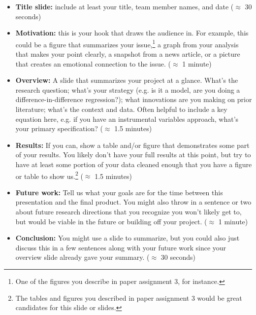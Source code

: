 \begin{itemize}
    \item[1)] \textbf{Title slide:} include at least your title, team member names, and date ($\approx$ 30 seconds)
    \item[2)] \textbf{Motivation:} this is your hook that draws the audience in. For example, this could be a figure that summarizes your issue,\footnote{One of the figures you describe in paper assignment 3, for instance.} a graph from your analysis that makes your point clearly, a snapshot from a news article, or a picture that creates an emotional connection to the issue. ($\approx$ 1 minute)
    \item[3)] \textbf{Overview:} A slide that summarizes your project at a glance. What's the research question; what's your strategy (e.g. is it a model, are you doing a difference-in-difference regression?); what innovations are you making on prior literature; what's the context and data. Often helpful to include a key equation here, e.g. if you have an instrumental variables approach, what's your primary specification? ($\approx$ 1.5 minutes)
    \item[4)] \textbf{Results:} If you can, show a table and/or figure that demonstrates some part of your results. You likely don't have your full results at this point, but try to have at least some portion of your data cleaned enough that you have a figure or table to show us.\footnote{The tables and figures you described in paper assignment 3 would be great candidates for this slide or slides.} ($\approx$ 1.5 minutes)
    \item[5)] \textbf{Future work: }Tell us what your goals are for the time between this presentation and the final product. You might also throw in a sentence or two about future research directions that you recognize you won't likely get to, but would be viable in the future or building off your project. ($\approx$ 1 minute)
    \item[6)] \textbf{Conclusion:} You might use a slide to summarize, but you could also just discuss this in a few sentences along with your future work since your overview slide already gave your summary. ($\approx$ 30 seconds)
\end{itemize}


